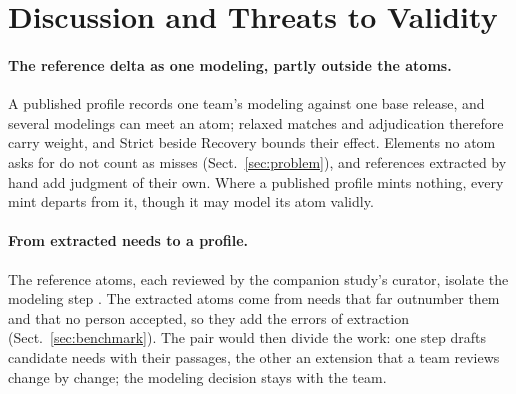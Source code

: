 \section{Discussion and Threats to Validity}\label{sec:discussion}

\paragraph{The reference delta as one modeling, partly outside the atoms.}
A published profile records one team's modeling against one base release, and several modelings can meet an atom;
relaxed matches and adjudication therefore carry weight, and Strict beside Recovery bounds their effect.
Elements no atom asks for do not count as misses (Sect.~\ref{sec:problem}), and references extracted by hand add %
judgment of their own.
Where a published profile mints nothing, every mint departs from it, though it may model its atom validly.

\paragraph{From extracted needs to a profile.}
The reference atoms, each reviewed by the companion study's curator, isolate the modeling step \cite{anon2027rq1}. %
The extracted atoms come from needs that far outnumber them and that no person accepted, so they add the errors of %
extraction (Sect.~\ref{sec:benchmark}).
The pair would then divide the work: one step drafts candidate needs with their passages, the other an extension
that a team reviews change by change; the modeling decision stays with the team.

